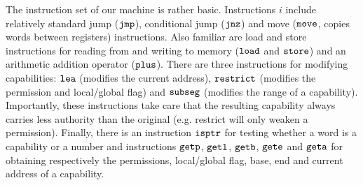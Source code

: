 \documentclass[compsoc,conference,letterpaper,fleqn]{IEEEtran}
\newcommand{\zinstr}[1]{\mathtt{#1}}
\newcommand{\oneinstr}[2]{
  \ifthenelse{\equal{#2}{}}
  {\zinstr{#1}}
  {\zinstr{#1} \; #2}
}
\newcommand{\jmp}[1]{\oneinstr{jmp}{#1}}
\newcommand{\twoinstr}[3]{
  \ifthenelse{\equal{#2#3}{}}
  {\zinstr{#1}}
  {\zinstr{#1} \; #2 \; #3}
}
\newcommand{\restricttwo}[2]{\twoinstr{restrict}{#1}{#2}}
\newcommand{\jnz}[2]{\twoinstr{jnz}{#1}{#2}}
\newcommand{\isptr}[2]{\twoinstr{isptr}{#1}{#2}}
\newcommand{\geta}[2]{\twoinstr{geta}{#1}{#2}}
\newcommand{\getb}[2]{\twoinstr{getb}{#1}{#2}}
\newcommand{\gete}[2]{\twoinstr{gete}{#1}{#2}}
\newcommand{\getp}[2]{\twoinstr{getp}{#1}{#2}}
\newcommand{\getl}[2]{\twoinstr{getl}{#1}{#2}}
\newcommand{\move}[2]{\twoinstr{move}{#1}{#2}}
\newcommand{\store}[2]{\twoinstr{store}{#1}{#2}}
\newcommand{\load}[2]{\twoinstr{load}{#1}{#2}}
\newcommand{\lea}[2]{\twoinstr{lea}{#1}{#2}}
\newcommand{\threeinstr}[4]{
  \ifthenelse{\equal{#2#3#4}{}}
  {\zinstr{#1}}
  {\zinstr{#1} \; #2 \; #3 \; #4}
}
\newcommand{\subseg}[3]{\threeinstr{subseg}{#1}{#2}{#3}}
\newcommand{\plus}[3]{\threeinstr{plus}{#1}{#2}{#3}}
\begin{document}
The instruction set of our machine is rather basic. Instructions $i$ include
relatively standard jump ($\jmp{}$), conditional jump ($\jnz{}{}$) and move
($\move{}{}$, copies words between registers) instructions. Also familiar are
load and store instructions for reading from and writing to memory ($\load{}{}$
and $\store{}{}$) and an arithmetic addition operator ($\plus{}{}{}$). There are
three instructions for modifying capabilities: $\lea{}{}$ (modifies the current
address), $\restricttwo{}{}$ (modifies the permission and local/global flag) and
$\subseg{}{}{}$ (modifies the range of a capability). Importantly, these
instructions take care that the resulting capability always carries less
authority than the original (e.g. restrict will only weaken a permission).
Finally, there is an instruction $\isptr{}{}$ for testing whether a word is a
capability or a number and instructions $\getp{}{}$, $\getl{}{}$, $\getb{}{}$,
$\gete{}{}$ and $\geta{}{}$ for obtaining respectively the permissions,
local/global flag, base, end and current address of a capability.
\end{document}
